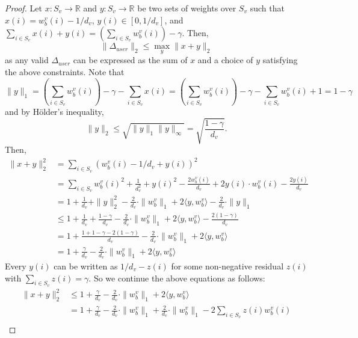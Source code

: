 \begin{proof}
Let $x: S_v \rightarrow \mathbb{R}$ and $y: S_v \rightarrow \mathbb{R}$ be two sets of weights over $S_v$ such that $x(i) = w_b^v(i) - 1/d_v$, $y(i) \in [0, 1/d_v]$, and $\sum_{i \in S_v} x(i) + y(i) = \left( \sum_{i \in S_v} w_b^v(i) \right) - \gamma$.
Then,
\begin{equation*}
    \|\Delta_{user}\|_2 \leq \max_y \|x + y\|_2
\end{equation*}
as any valid $\Delta_{user}$ can be expressed as the sum of $x$ and a choice of $y$ satisfying the above constraints.
Note that
\begin{equation*}
    \|y\|_1 = \left(\sum_{i \in S_v} w_b^v(i) \right) - \gamma - \sum_{i \in S_v} x(i)
    = \left(\sum_{i \in S_v} w_b^v(i) \right) - \gamma - \sum_{i \in S_v} w_b^v(i) + 1
    = 1 - \gamma
\end{equation*}
and by H\"older's inequality, 
\begin{equation*}
    \|y\|_2 \leq \sqrt{\|y\|_1 \|y\|_\infty} = \sqrt{\frac{1 - \gamma}{d_v}}.
\end{equation*}
Then,
\begin{align*}
    \|x + y\|_2^2 &= \sum_{i \in S_v} \left(w_b^v(i) - 1/d_v + y(i)\right)^2 \\
    &= \sum_{i \in S_v} w_b^v(i)^2 + \frac{1}{d_v^2} + y(i)^2 - \frac{2 w_b^v(i)}{d_v} + 2 y(i) \cdot w_b^v(i) - \frac{2y(i)}{d_v} \\
    &= 1 + \frac{1}{d_v} + \|y\|_2^2 - \frac{2}{d_v} \cdot \|w_b^v\|_1  + 2 \langle y, w_b^v \rangle - \frac{2}{d_v} \cdot \|y\|_1  \\
    &\leq 1 + \frac{1}{d_v} + \frac{1-\gamma}{d_v} - \frac{2}{d_v} \cdot \|w_b^v\|_1  + 2 \langle y, w_b^v \rangle - \frac{2(1-\gamma)}{d_v}  \\
    &= 1 + \frac{1 + 1-\gamma - 2(1-\gamma)}{d_v}  - \frac{2}{d_v} \cdot \|w_b^v\|_1  + 2 \langle y, w_b^v \rangle   \\
    &= 1  + \frac{\gamma}{d_v} - \frac{2}{d_v} \cdot \|w_b^v\|_1  + 2 \langle y, w_b^v \rangle
\end{align*}
Every $y(i)$ can be written as $1/d_v - z(i)$ for some non-negative residual $z(i)$ with $\sum_{i \in S_v} z(i) = \gamma$. So we continue the above equations as follows: 
\begin{align*}
    \|x + y\|_2^2 
    &\leq  1  + \frac{\gamma}{d_v} - \frac{2}{d_v} \cdot \|w_b^v\|_1  + 2 \langle y, w_b^v \rangle\\
    &=  1  + \frac{\gamma}{d_v} - \frac{2}{d_v} \cdot \|w_b^v\|_1  + \frac{2}{d_v}  \cdot \|w_b^v\|_1 -  2\sum_{i \in S_v} z(i) w_b^v(i) \\

\end{align*}
\end{proof}
